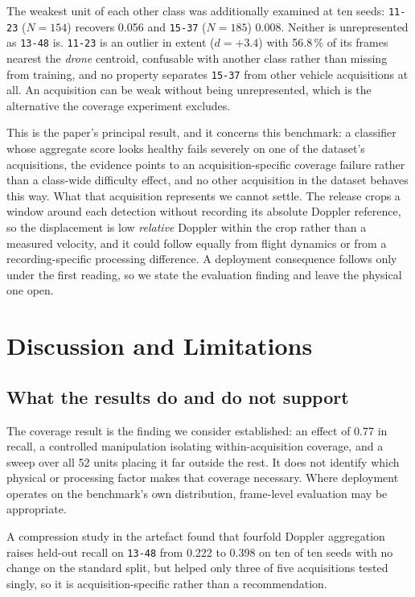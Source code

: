 \documentclass[conference]{IEEEtran}
\begin{document}
The weakest unit of each other class was additionally examined at ten
seeds: \texttt{11-23} ($N=154$) recovers 0.056 and \texttt{15-37} ($N=185$)
0.008. Neither is unrepresented as \texttt{13-48} is. \texttt{11-23} is an
outlier in extent ($d=+3.4$) with 56.8\,\% of its frames nearest the
\emph{drone} centroid, confusable with another class rather than missing
from training, and no property separates \texttt{15-37} from other vehicle
acquisitions at all. An acquisition can be weak without being
unrepresented, which is the alternative the coverage experiment excludes.

This is the paper's principal result, and it concerns this benchmark: a
classifier whose aggregate score looks healthy fails severely on one of the
dataset's acquisitions, the evidence points to an acquisition-specific
coverage failure rather than a class-wide difficulty effect, and no other
acquisition in the dataset behaves this way. What
that acquisition represents we cannot settle. The release crops a window
around each detection without recording its absolute Doppler reference, so
the displacement is low \emph{relative} Doppler within the crop rather than
a measured velocity, and it could follow equally from flight dynamics or
from a recording-specific processing difference. A
deployment consequence follows only under the first reading, so we state the
evaluation finding and leave the physical one open.

\section{Discussion and Limitations}
\label{sec:discussion}

\subsection{What the results do and do not support}

The coverage result is the finding we consider established: an effect of 0.77 in recall, a controlled manipulation isolating within-acquisition coverage, and a sweep over all 52 units placing it far outside the rest. It does not identify which physical or processing factor makes that coverage necessary. Where deployment operates on the benchmark's own distribution, frame-level evaluation may be appropriate.

A compression study in the artefact found that fourfold Doppler aggregation raises held-out recall on \texttt{13-48} from 0.222 to 0.398 on ten of ten seeds with no change on the standard split, but helped only three of five acquisitions tested singly, so it is acquisition-specific rather than a recommendation.
\end{document}
